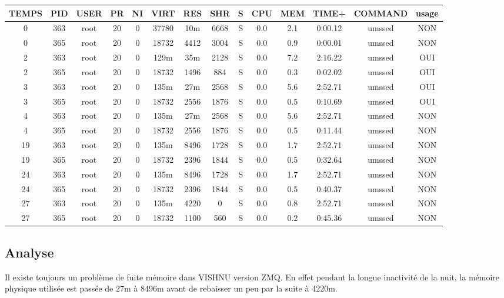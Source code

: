 \documentclass{article}
\begin{document}
\begin{tabular}{|c|c|c|c|c|c|c|c|c|c|c|c|c|c|}
\hline
TEMPS & PID & USER & PR & NI & VIRT & RES & SHR & S & CPU & MEM & TIME+ & COMMAND & usage \\
\hline
0 & 363 & root & 20 & 0 & 37780 & 10m & 6668 & S & 0.0 & 2.1 & 0:00.12 & umssed & NON \\                      
0 & 365 & root & 20 & 0 & 18732 & 4412 & 3004 & S & 0.0 & 0.9 & 0:00.01 & umssed  & NON \\
\hline
2 & 363 & root & 20 & 0 & 129m & 35m & 2128 & S & 0.0 & 7.2 & 2:16.22 & umssed & OUI\\
2 & 365 & root & 20 & 0 & 18732 & 1496 & 884 & S & 0.0 & 0.3 & 0:02.02 & umssed & OUI \\
\hline
3 & 363 & root & 20 & 0 & 135m & 27m & 2568 & S & 0.0 & 5.6 & 2:52.71 & umssed & OUI \\
3 & 365 & root & 20 & 0 & 18732 & 2556 & 1876 & S & 0.0 & 0.5 & 0:10.69 & umssed & OUI \\
\hline
4 & 363 & root & 20 & 0 & 135m & 27m & 2568 & S & 0.0 & 5.6 & 2:52.71 & umssed & NON \\
4 & 365 & root & 20 & 0 & 18732 & 2556 & 1876 & S & 0.0 & 0.5 & 0:11.44 & umssed & NON \\
\hline
19 & 363 & root & 20 & 0 & 135m & 8496 & 1728 & S & 0.0 & 1.7 & 2:52.71 & umssed & NON \\
19 & 365 & root & 20 & 0 & 18732 & 2396 & 1844 & S & 0.0 & 0.5 & 0:32.64 & umssed & NON\\
\hline
24 & 363 & root & 20 & 0 & 135m & 8496 & 1728 & S & 0.0 & 1.7 & 2:52.71 & umssed & NON \\
24 & 365 & root & 20 & 0 & 18732 & 2396 & 1844 & S & 0.0 & 0.5 & 0:40.37 & umssed & NON \\
\hline
27 & 363 & root & 20 & 0 & 135m & 4220 & 0 & S & 0.0 & 0.8 & 2:52.71 & umssed & NON \\
27 & 365 & root & 20 & 0 & 18732 & 1100 & 560 & S & 0.0 & 0.2 & 0:45.36 & umssed & NON \\
\hline
\end{tabular}

\subsection{Analyse}
Il existe toujours un problème de fuite mémoire dans VISHNU version ZMQ.
En effet pendant la longue inactivité de la nuit, la mémoire physique
utilisée est passée de 27m à 8496m avant de rebaisser un peu par la suite
à 4220m.
\end{document}
